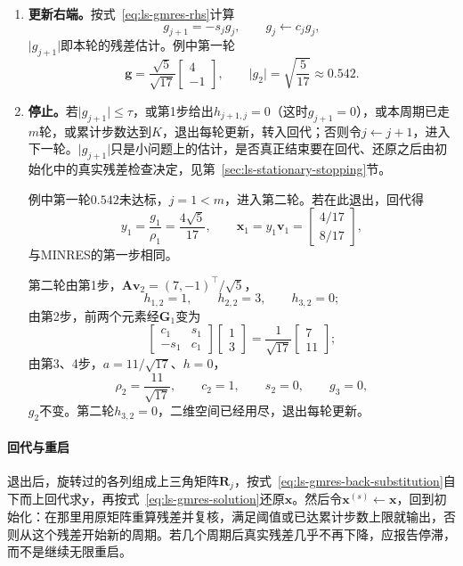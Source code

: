 \begin{enumerate}
 \item \textbf{更新右端。}按式~\eqref{eq:ls-gmres-rhs}计算
 \[
  g_{j+1}=-s_jg_j,\qquad g_j\leftarrow c_jg_j ,
 \]
 $\lvert g_{j+1}\rvert$即本轮的残差估计。例中第一轮
 \[
  \bm g=\frac{\sqrt5}{\sqrt{17}}\begin{bmatrix}4\\-1\end{bmatrix},\qquad \lvert g_2\rvert=\sqrt{\frac5{17}}\approx0.542 .
 \]

 \item \textbf{停止。}若$\lvert g_{j+1}\rvert\le\tau$，或第1步给出$h_{j+1,j}=0$（这时$g_{j+1}=0$），或本周期已走$m$轮，或累计步数达到$K$，退出每轮更新，转入回代；否则令$j\leftarrow j+1$，进入下一轮。$\lvert g_{j+1}\rvert$只是小问题上的估计，是否真正结束要在回代、还原之后由初始化中的真实残差检查决定，见第~\ref{sec:ls-stationary-stopping}节。

 例中第一轮$0.542$未达标，$j=1<m$，进入第二轮。若在此退出，回代得
 \[
  y_1=\frac{g_1}{\rho_1}=\frac{4\sqrt5}{17},\qquad
  \bm x_1=y_1\bm v_1=\begin{bmatrix}4/17\\8/17\end{bmatrix},
 \]
 与MINRES的第一步相同。

 第二轮由第1步，$\bm A\bm v_2=(7,-1)^\top/\sqrt5$，
 \[
  h_{1,2}=1,\qquad h_{2,2}=3,\qquad h_{3,2}=0 ;
 \]
 由第2步，前两个元素经$\bm G_1$变为
 \[
  \begin{bmatrix}c_1&s_1\\-s_1&c_1\end{bmatrix}\begin{bmatrix}1\\3\end{bmatrix}
  =\frac1{\sqrt{17}}\begin{bmatrix}7\\11\end{bmatrix};
 \]
 由第3、4步，$a=11/\sqrt{17}$、$h=0$，
 \[
  \rho_2=\frac{11}{\sqrt{17}},\qquad c_2=1,\qquad s_2=0,\qquad g_3=0 ,
 \]
 $g_2$不变。第二轮$h_{3,2}=0$，二维空间已经用尽，退出每轮更新。
\end{enumerate}

\paragraph{回代与重启}
退出后，旋转过的各列组成上三角矩阵$\bm R_j$，按式~\eqref{eq:ls-gmres-back-substitution}自下而上回代求$\bm y$，再按式~\eqref{eq:ls-gmres-solution}还原$\bm x$。然后令$\bm x^{(s)}\leftarrow\bm x$，回到初始化：在那里用原矩阵重算残差并复核，满足阈值或已达累计步数上限就输出，否则从这个残差开始新的周期。若几个周期后真实残差几乎不再下降，应报告停滞，而不是继续无限重启。

